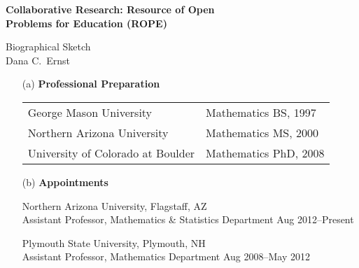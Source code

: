 \documentclass[11pt]{article}
\begin{document}
\begin{center}
{\Large \textbf{Collaborative Research: Resource of Open\\
Problems for Education (ROPE)}}

\bigskip

{\Large Biographical Sketch}\\
\vspace{.25em}
Dana C.~Ernst
\end{center}

\begin{enumerate}[leftmargin=*]

\item[(a)] \textbf{Professional Preparation}

\begin{tabularx}{6.4in}{@{}XX}
George Mason University  & Mathematics \hfill BS, 1997\\
Northern Arizona University & Mathematics \hfill MS, 2000\\
University of Colorado at Boulder & Mathematics \hfill PhD, 2008
\end{tabularx}

\item[(b)] \textbf{Appointments}

Northern Arizona University, Flagstaff, AZ\\
Assistant Professor, Mathematics \& Statistics Department  \hfill Aug 2012--Present

\vspace{.25em}

Plymouth State University, Plymouth, NH\\
Assistant Professor, Mathematics Department  \hfill Aug 2008--May 2012
 
%


%

%


\end{enumerate}
\end{document}
